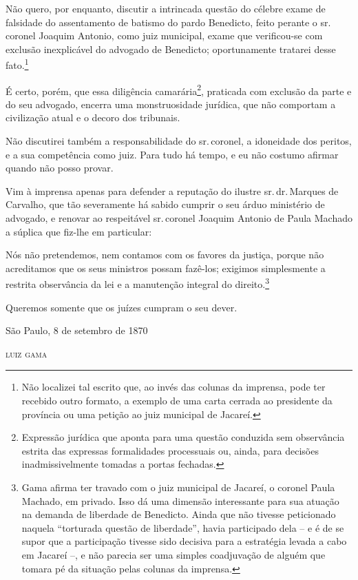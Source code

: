 Não quero, por enquanto, discutir a intrincada questão do célebre exame
de falsidade do assentamento de batismo do pardo Benedicto, feito
perante o sr.\,coronel Joaquim Antonio, como juiz municipal, exame que
verificou-se com exclusão inexplicável do advogado de Benedicto;
oportunamente tratarei desse fato.\footnote{ Não localizei tal escrito
  que, ao invés das colunas da imprensa, pode ter recebido outro
  formato, a exemplo de uma carta cerrada ao presidente da província ou
  uma petição ao juiz municipal de Jacareí.}

É certo, porém, que essa diligência camarária\footnote{ Expressão
  jurídica que aponta para uma questão conduzida sem observância estrita
  das expressas formalidades processuais ou, ainda, para decisões
  inadmissivelmente tomadas a portas fechadas.}, praticada com exclusão
da parte e do seu advogado, encerra uma monstruosidade jurídica, que não
comportam a civilização atual e o decoro dos tribunais.

Não discutirei também a responsabilidade do sr.\,coronel, a idoneidade
dos peritos, e a sua competência como juiz. Para tudo há tempo, e eu não
costumo afirmar quando não posso provar.

Vim à imprensa apenas para defender a reputação do ilustre sr.\,dr.\,Marques de Carvalho, que tão severamente há sabido cumprir o seu árduo
ministério de advogado, e renovar ao respeitável sr.\,coronel Joaquim
Antonio de Paula Machado a súplica que fiz-lhe em particular:

Nós não pretendemos, nem contamos com os favores da justiça, porque não
acreditamos que os seus ministros possam fazê-los; exigimos simplesmente
a restrita observância da lei e a manutenção integral do
direito.\footnote{ Gama afirma ter travado com o juiz municipal de
  Jacareí, o coronel Paula Machado, em privado. Isso dá uma dimensão
  interessante para sua atuação na demanda de liberdade de Benedicto.
  Ainda que não tivesse peticionado naquela ``torturada questão de
  liberdade'', havia participado dela -- e é de se supor que a
  participação tivesse sido decisiva para a estratégia levada a cabo em
  Jacareí --, e não parecia ser uma simples coadjuvação de alguém que
  tomara pé da situação pelas colunas da imprensa.}

Queremos somente que os juízes cumpram o seu dever.

\begin{flushright}
São Paulo, 8 de setembro de 1870

\textsc{luiz gama}
\end{flushright}

